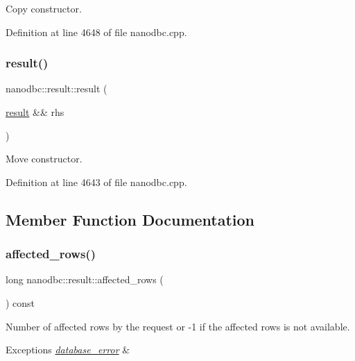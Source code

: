 Copy constructor. 



Definition at line 4648 of file nanodbc.\+cpp.

\mbox{\label{classnanodbc_1_1result_af616d94ee18fa55cfd60687b98ff9ebd}} 
\subsubsection{\texorpdfstring{result()}{result()}\hspace{0.1cm}{\footnotesize\ttfamily [3/3]}}
{\footnotesize\ttfamily nanodbc\+::result\+::result (\begin{DoxyParamCaption}\item[{\mbox{\hyperlink{classnanodbc_1_1result}{result}} \&\&}]{rhs }\end{DoxyParamCaption})\hspace{0.3cm}{\ttfamily [noexcept]}}



Move constructor. 



Definition at line 4643 of file nanodbc.\+cpp.



\subsection{Member Function Documentation}
\mbox{\label{classnanodbc_1_1result_ab038630cf35248dc6731eea37b14d12d}} 
\subsubsection{\texorpdfstring{affected\_rows()}{affected\_rows()}}
{\footnotesize\ttfamily long nanodbc\+::result\+::affected\+\_\+rows (\begin{DoxyParamCaption}{ }\end{DoxyParamCaption}) const}



Number of affected rows by the request or -\/1 if the affected rows is not available. 


\begin{DoxyExceptions}{Exceptions}
{\em \mbox{\hyperlink{classnanodbc_1_1database__error}{database\+\_\+error}}} & \\
\hline
\end{DoxyExceptions}


